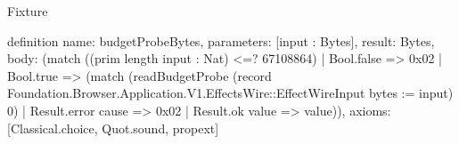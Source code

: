 \begin{lexlean}{Fixture}
\begin{semanticmodule}
definition{
  name: budgetProbeBytes,
  parameters: [input : Bytes],
  result: Bytes,
  body: (match ((prim length input : Nat) <=? 67108864)
    | Bool.false => 0x02
    | Bool.true => (match (readBudgetProbe (record Foundation.Browser.Application.V1.EffectsWire::EffectWireInput {bytes := input}) 0)
      | Result.error cause => 0x02
      | Result.ok value => value)),
  axioms: [Classical.choice, Quot.sound, propext]
}
\end{semanticmodule}
\end{lexlean}
